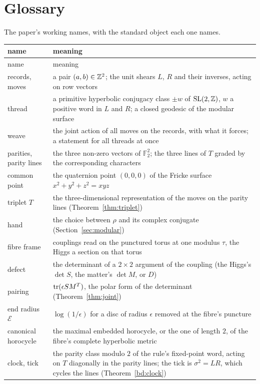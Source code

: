 \section{Glossary}\label{app:glossary}

The paper's working names, with the standard object each one names.

{\footnotesize
\begin{longtable}{@{}p{3.4cm}p{12.0cm}@{}}
\toprule
name & meaning \\
\midrule
\endfirsthead
\toprule
name & meaning \\
\midrule
\endhead
\bottomrule
\endlastfoot
records, moves & a pair $(a,b)\in\mathbb{Z}^2$; the unit shears $L$, $R$ and their inverses, acting on row vectors \\
thread & a primitive hyperbolic conjugacy class $\pm w$ of $\mathrm{SL}(2,\mathbb{Z})$, $w$ a positive word in $L$ and $R$; a closed geodesic of the modular surface \\
weave & the joint action of all moves on the records, with what it forces; a statement for all threads at once \\
parities, parity lines & the three non-zero vectors of $\mathbb F_2^2$; the three lines of $T$ graded by the corresponding characters \\
common point & the quaternion point $(0,0,0)$ of the Fricke surface $x^2+y^2+z^2=xyz$ \\
triplet $T$ & the three-dimensional representation of the moves on the parity lines (Theorem~\ref{thm:triplet}) \\
hand & the choice between $\rho$ and its complex conjugate (Section~\ref{sec:modular}) \\
fibre frame & couplings read on the punctured torus at one modulus $\tau$, the Higgs a section on that torus \\
defect & the determinant of a $2\times2$ argument of the coupling (the Higgs's $\det S$, the matter's $\det M$, or $D$) \\
pairing & $\operatorname{tr}(\epsilon SM^T)$, the polar form of the determinant (Theorem~\ref{thm:joint}) \\
end radius $\mathcal E$ & $\log(1/\epsilon)$ for a disc of radius $\epsilon$ removed at the fibre's puncture \\
canonical horocycle & the maximal embedded horocycle, or the one of length $2$, of the fibre's complete hyperbolic metric \\
clock, tick & the parity class modulo $2$ of the rule's fixed-point word, acting on $T$ diagonally in the parity lines; the tick is $\sigma^2=LR$, which cycles the lines (Theorem~\ref{bd:clock}) \\

\end{longtable}}
